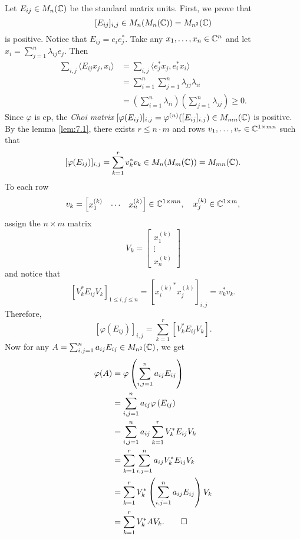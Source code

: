 \begin{myproof}
    Let $E_{ij} \in M_n (\mathbb {C})$ be the standard matrix units.
    First, we prove that 
    $$[E_{ij}]_{i, j} \in M_n (M_n (\mathbb {C})) = M_{n^2} (\mathbb {C})$$ is positive.
    Notice that $E_{ij} = e_i e_j^*$.
    Take any $x_1, \dots, x_n \in \mathbb {C} ^{n}$ and let $x_i = \sum_{j = 1} ^n \lambda_{ij} e_j$. Then  
    \begin{align*}
        \sum_{i, j} \langle E_{ij} x_j, x_i \rangle &= \sum _{i, j} \langle e_j ^* x_j, e_i ^* x_i \rangle\\
        &= \sum_{i = 1} ^n \sum_{j = 1} ^n \lambda_{jj} \lambda_{ii}\\
        &= \left(\sum_{i = 1} ^n \lambda_{ii} \right) \left( \sum_{j = 1} ^n \lambda_{jj} \right) \geq 0.
    \end{align*}
    Since $\varphi$ is cp, the \emph{Choi matrix} 
    $[\varphi(E_{ij})]_{i, j} = \varphi^{(n)} ([E_{ij}]_{i, j}) \in M_{mn}(\mathbb {C})$ is positive.
    By the lemma \ref{lem:7.1}, there exists $r \leq n \cdot m$ and rows $v_1, \dots, v_r \in \mathbb {C}^{1 \times mn}$ such that 
    $$[\varphi (E_{ij})]_{i, j} = \sum_{k = 1} ^r v_k ^* v_k \in M_n (M_m (\mathbb {C})) = M_{mn} (\mathbb {C}).$$
    To each row 
    $$v_k = \begin{bmatrix}
        x_1 ^{(k)}  & \cdots & x_n ^{(k)}
    \end{bmatrix} \in \mathbb {C}^{1 \times mn},\quad x_j ^{(k)} \in \mathbb {C}^{1 \times m},$$
    assign the $n \times m$ matrix
    $$V_k = \begin{bmatrix}
        x_1 ^{(k)} \\
         \vdots \\
         x_n ^{(k)}
    \end{bmatrix}$$
    and notice that 
    $$[V_k ^* E_{ij} V_k ]_{1 \leq i, j \leq n} = [{x_i ^{(k)}} ^* x_j ^{(k)}]_{i, j} = v_k ^* v_k.$$
    Therefore, $$[\varphi(E_{ij})]_{i, j} = \sum_{k = 1} ^r [V_k ^* E_{ij} V_k].$$
    Now for any $A = \sum_{i, j = 1} ^n a_{ij} E_{ij} \in M_{n^2} (\mathbb {C})$, we get 
    \begin{align*}
        \varphi (A) &= \varphi \left(\sum_{i, j = 1} ^n a_{ij} E_{ij}\right)\\
        &= \sum_{i, j = 1} ^n a_{ij} \varphi \left(E_{ij}\right)\\
        &= \sum_{i, j = 1} ^n a_{ij} \sum_{k = 1}^{r} V_k ^* E_{ij} V_k\\
        &= \sum_{k = 1}^{r} \sum_{i, j = 1} ^n a_{ij} V_k ^* E_{ij} V_k\\
        &= \sum_{k = 1}^{r} V_k ^* \left( \sum_{i, j = 1} ^n a_{ij} E_{ij} \right) V_k\\
        &= \sum_{k = 1}^{r} V_k ^* A V_k. \qedhere
    \end{align*}
\end{myproof}

